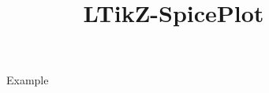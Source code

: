 \documentclass{article}
\title{LTikZ-SpicePlot}
\date{}
\author{}
\begin{document}
    \maketitle
    \lipsum[1]
    \begin{figure}[h]
        \centering
        
        \caption{Example}
    \end{figure}
    \lipsum[2]
\end{document}
